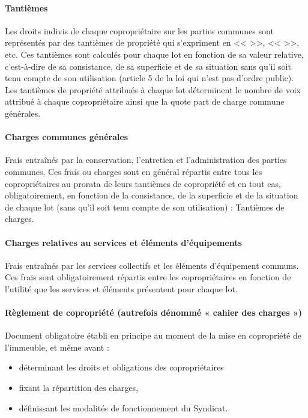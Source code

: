 	\paragraph*{Tantièmes}
	Les droits indivis de chaque copropriétaire sur les parties communes sont représentés par des tantièmes de propriété qui s'expriment en << \ieme{} >>, << \ieme{} >>, etc. Ces tantièmes sont calculés pour chaque lot en fonction de sa valeur relative, c’est-à-dire de sa consistance, de sa superficie et de sa situation sans qu'il soit tenu compte de son utilisation (article 5 de la loi qui n'est pas d'ordre public).
	Les tantièmes de propriété attribués à chaque lot déterminent le nombre de voix attribué à chaque copropriétaire ainsi que la quote part de charge commune générales.
	
	\paragraph*{Charges communes générales}
	Frais entraînés par la conservation, l'entretien et l'administration des parties communes.
	Ces frais ou charges sont en général répartis entre tous les copropriétaires au prorata de leurs tantièmes de copropriété et en tout cas, obligatoirement, en fonction de la consistance, de la superficie et de la situation de chaque lot (sans qu'il soit tenu compte de son utilisation) : Tantièmes de charges.
	
	\paragraph*{Charges relatives au services et éléments d’équipements}
	Frais entraînés par les services collectifs et les éléments d'équipement communs.
	Ces frais sont obligatoirement répartis entre les copropriétaires en fonction de l'utilité que les services et éléments présentent pour chaque lot.
	
	\paragraph*{Règlement de copropriété (autrefois dénommé « cahier des charges »)}
	Document obligatoire établi en principe au moment de la mise en copropriété de l'immeuble, et même avant :
	\begin{itemize}
		\item déterminant les droits et obligations des copropriétaires
		\item  fixant la répartition des charges,
		\item  définissant les modalités de fonctionnement du Syndicat.
	\end{itemize}
	
